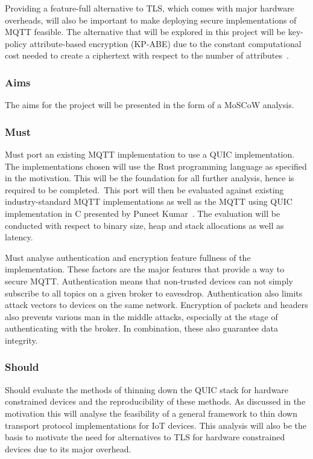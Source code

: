 \documentclass[11pt]{article}
\begin{document}
Providing a feature-full alternative to TLS, which comes with major hardware overheads, will also be important to make deploying secure implementations of MQTT feasible.
The alternative that will be explored in this project will be key-policy attribute-based encryption (KP-ABE) due to the constant computational cost needed to create a ciphertext with respect to the number of attributes~\cite{wang_key-policy_2012}.

\subsubsection{Aims}\label{aims}

The aims for the project will be presented in the form of a MoSCoW analysis.

\subsubsection*{Must}

Must port an existing MQTT implementation to use a QUIC implementation.
The implementations chosen will use the Rust programming language as specified in the motivation.
This will be the foundation for all further analysis, hence is required to be completed.\
This port will then be evaluated against existing industry-standard MQTT implementations as well as the MQTT using QUIC implementation in C presented by Puneet Kumar~\cite{kumar_implementation_2019}.
The evaluation will be conducted with respect to binary size, heap and stack allocations as well as latency.

Must analyse authentication and encryption feature fullness of the implementation.
These factors are the major features that provide a way to secure MQTT.
Authentication means that non-trusted devices can not simply subscribe to all topics on a given broker to eavesdrop.
Authentication also limits attack vectors to devices on the same network.
Encryption of packets and headers also prevents various man in the middle attacks, especially at the stage of authenticating with the broker.
In combination, these also guarantee data integrity.

\subsubsection*{Should}

Should evaluate the methods of thinning down the QUIC stack for hardware constrained devices and the reproducibility of these methods.
As discussed in the motivation this will analyse the feasibility of a general framework to thin down transport protocol implementations for IoT devices.
This analysis will also be the basis to motivate the need for alternatives to TLS for hardware constrained devices due to its major overhead.
\end{document}

